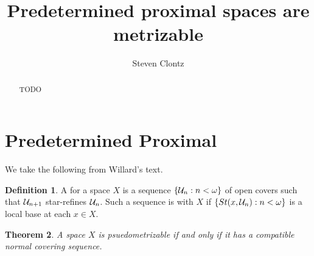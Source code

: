 \documentclass{amsart}
\newtheorem{theorem}{Theorem}[section]
\theoremstyle{definition}
\newtheorem{definition}[theorem]{Definition}
\begin{document}
\title{Predetermined proximal spaces are metrizable}




\author{Steven Clontz}
\address{Department of Mathematics and Statistics, University of South Alabama,
Mobile, AL 36688}




\begin{abstract}
TODO
\end{abstract}


\maketitle

\section{Predetermined Proximal}

We take the following from Willard's text.

\begin{definition}
A  for a space \(X\) is a sequence
\(\left\{\mathcal{U}_n:n<\omega\right\}\) of open covers such that
\(\mathcal{U}_{n+1}\) star-refines \(\mathcal{U}_n\). Such a sequence is
 with \(X\) if \(\left\{St(x,\mathcal{U}_n):n<\omega\right\}\)
is a local base at each \(x\in X\).
\end{definition}
\begin{theorem}
A space \(X\) is psuedometrizable if and only if it has a compatible
normal covering sequence.
\end{theorem}
\end{document}

